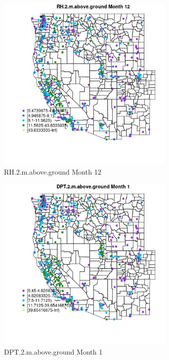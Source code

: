 \begin{figure} 
\centering  
\includegraphics[width=0.77\textwidth]{Code_Outputs/ML_input_report_ML_input_PM25_Step5_part_d_de_duplicated_aves_ML_input_MapObsMo12RH2maboveground.jpg} 
\caption{\label{fig:ML_input_report_ML_input_PM25_Step5_part_d_de_duplicated_aves_ML_inputMapObsMo12RH2maboveground}RH.2.m.above.ground Month 12} 
\end{figure} 
 

\begin{figure} 
\centering  
\includegraphics[width=0.77\textwidth]{Code_Outputs/ML_input_report_ML_input_PM25_Step5_part_d_de_duplicated_aves_ML_input_MapObsMo1DPT2maboveground.jpg} 
\caption{\label{fig:ML_input_report_ML_input_PM25_Step5_part_d_de_duplicated_aves_ML_inputMapObsMo1DPT2maboveground}DPT.2.m.above.ground Month 1} 
\end{figure} 
 

